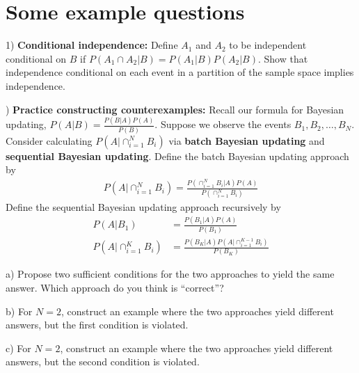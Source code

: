 \documentclass[12pt,english]{article}
\begin{document}
\section{Some example questions}

1) \textbf{Conditional independence:} Define $A_{1}$ and $A_{2}$ to be independent conditional on $B$ if $P(A_{1} \cap A_{2} | B) = P(A_{1} | B) P(A_{2} | B)$. Show that independence conditional on each event in a partition of the sample space implies independence.

\vspace{1em}
) \textbf{Practice constructing counterexamples:} Recall our formula for Bayesian updating, $P(A | B) = \frac{P(B | A) P(A)}{P(B)}$. Suppose we observe the events $B_{1}, B_{2}, \ldots, B_{N}$. Consider calculating $P(A | \cap_{i = 1}^{N} B_{i})$ via \textbf{batch Bayesian updating} and \textbf{sequential Bayesian updating}. Define the batch Bayesian updating approach by
\begin{align*}
P(A | \cap_{i = 1}^{N} B_{i}) = \frac{P(\cap_{i = 1}^{N} B_{i} | A) P(A)}{P(\cap_{i = 1}^{N} B_{i})}
\end{align*}
Define the sequential Bayesian updating approach recursively by
\begin{align*}
P(A | B_{1}) & = \frac{P(B_{1} | A) P(A)}{P(B_{1})} \\
P(A | \cap_{i = 1}^{K} B_{i}) & = \frac{P(B_{K} | A) P(A | \cap_{i = 1}^{K - 1} B_{i})}{P(B_{K})}
\end{align*}

a) Propose two sufficient conditions for the two approaches to yield the same answer. Which approach do you think is ``correct''?

b) For $N = 2$, construct an example where the two approaches yield different answers, but the first condition is violated.

c) For $N = 2$, construct an example where the two approaches yield different answers, but the second condition is violated.
\end{document}
